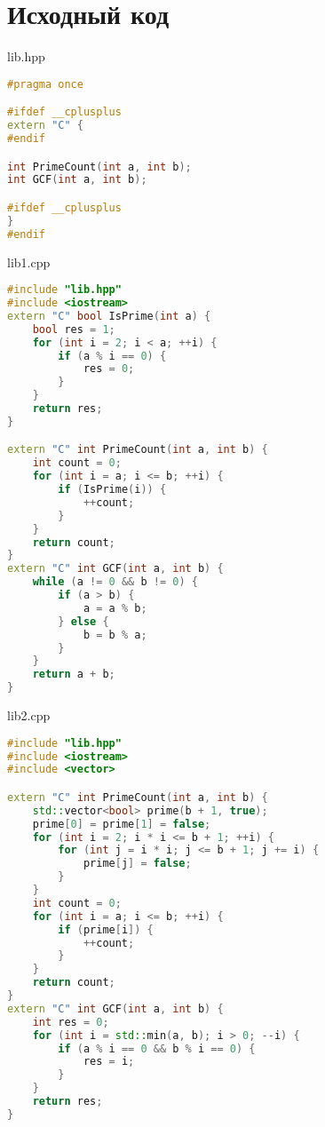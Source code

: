 \documentclass[a4paper, 12pt]{article}
\begin{document}
\newpage

\section{Исходный код}
lib.hpp
\begin{lstlisting}[language=C++]
#pragma once 

#ifdef __cplusplus
extern "C" {
#endif

int PrimeCount(int a, int b);
int GCF(int a, int b);

#ifdef __cplusplus
}
#endif
\end{lstlisting}

lib1.cpp
\begin{lstlisting}[language=C++]
#include "lib.hpp"
#include <iostream>
extern "C" bool IsPrime(int a) {
    bool res = 1;
    for (int i = 2; i < a; ++i) {
        if (a % i == 0) {
            res = 0;
        }
    }
    return res;
} 

extern "C" int PrimeCount(int a, int b) {
    int count = 0;
    for (int i = a; i <= b; ++i) {
        if (IsPrime(i)) {
            ++count;
        }
    }
    return count;
}
extern "C" int GCF(int a, int b) {
    while (a != 0 && b != 0) {
        if (a > b) {
            a = a % b;
        } else {
            b = b % a;
        }
    }
    return a + b;
}
\end{lstlisting}

lib2.cpp
\begin{lstlisting}[language=C++]
#include "lib.hpp"
#include <iostream>
#include <vector>

extern "C" int PrimeCount(int a, int b) {
    std::vector<bool> prime(b + 1, true);
    prime[0] = prime[1] = false;
    for (int i = 2; i * i <= b + 1; ++i) {
        for (int j = i * i; j <= b + 1; j += i) {
            prime[j] = false;
        }
    }
    int count = 0;
    for (int i = a; i <= b; ++i) {
        if (prime[i]) {
            ++count;
        }
    }
    return count;
}
extern "C" int GCF(int a, int b) {
    int res = 0;
    for (int i = std::min(a, b); i > 0; --i) {
        if (a % i == 0 && b % i == 0) {
            res = i;
        }
    }
    return res;
}
\end{lstlisting}
\end{document}
